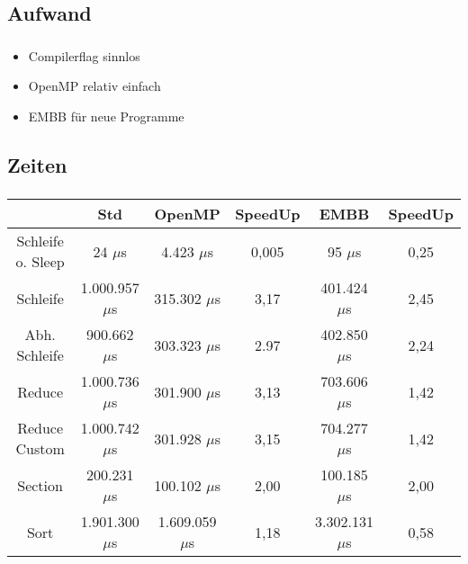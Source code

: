 \subsection{Aufwand}
\begin{frame}
	\frametitle{\secname}
	\framesubtitle{\subsecname}
	
	\begin{itemize}
		\item Compilerflag sinnlos
		\item OpenMP relativ einfach
		\item EMBB für neue Programme
	\end{itemize}
\end{frame}

\subsection{Zeiten}
\begin{frame}
	\frametitle{\secname}
	\framesubtitle{\subsecname}
	
	\begin{scriptsize}
	\begin{tabular}{|c|c|cc|cc|}
	\hline 
	 & \textbf{Std} & \textbf{OpenMP} & \textbf{SpeedUp} & \textbf{EMBB} & \textbf{SpeedUp} \\
	\hline 
	Schleife o. Sleep & 24 $\mu$s & 4.423 $\mu$s & 0,005 & 95 $\mu$s & 0,25 \\ 
	\hline  
	Schleife & 1.000.957 $\mu$s & 315.302 $\mu$s & 3,17 & 401.424 $\mu$s & 2,45 \\ 
	\hline 
	Abh. Schleife & 900.662 $\mu$s & 303.323 $\mu$s & 2.97 & 402.850 $\mu$s & 2,24 \\ 
	\hline 
	Reduce & 1.000.736 $\mu$s & 301.900 $\mu$s & 3,13 & 703.606 $\mu$s & 1,42 \\ 
	\hline 
	Reduce Custom & 1.000.742 $\mu$s & 301.928 $\mu$s & 3,15 & 704.277 $\mu$s & 1,42 \\ 
	\hline 
	Section & 200.231 $\mu$s & 100.102 $\mu$s & 2,00 & 100.185 $\mu$s & 2,00 \\ 
	\hline 
	Sort & 1.901.300 $\mu$s & 1.609.059 $\mu$s & 1,18 & 3.302.131 $\mu$s & 0,58 \\ 
	\hline 
	\end{tabular}
	\end{scriptsize}
\end{frame}